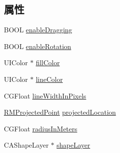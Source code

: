 \subsection*{属性}
\begin{DoxyCompactItemize}
\item 
B\-O\-O\-L \hyperlink{interface_r_m_circle_ae3453eee968397a9ec223960f8f3df0f}{enable\-Dragging}
\item 
B\-O\-O\-L \hyperlink{interface_r_m_circle_ad3138252a9207ccb1639839ddb2c42b8}{enable\-Rotation}
\item 
U\-I\-Color $\ast$ \hyperlink{interface_r_m_circle_aa00ef131c513cfb8c540d092a733f3fe}{fill\-Color}
\item 
U\-I\-Color $\ast$ \hyperlink{interface_r_m_circle_a4d11b58b738e2bf11a6041d2388f63eb}{line\-Color}
\item 
C\-G\-Float \hyperlink{interface_r_m_circle_a3772331ca60c8812a35183c856983a17}{line\-Width\-In\-Pixels}
\item 
\hyperlink{struct_r_m_projected_point}{R\-M\-Projected\-Point} \hyperlink{interface_r_m_circle_a676b4e82ff075de3e4468a12f506006f}{projected\-Location}
\item 
C\-G\-Float \hyperlink{interface_r_m_circle_a9b20cc4c242976d1e4dec2439c31fc51}{radius\-In\-Meters}
\item 
C\-A\-Shape\-Layer $\ast$ \hyperlink{interface_r_m_circle_a7d1ee226bef3b061c4ca301957d91382}{shape\-Layer}
\end{DoxyCompactItemize}


